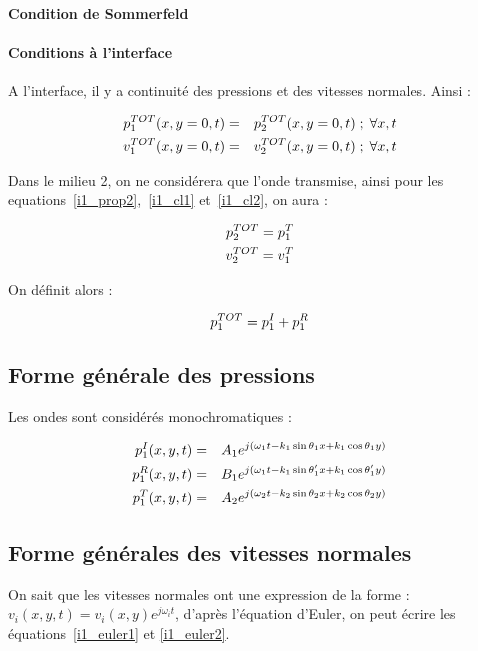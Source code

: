 \paragraph{Condition de Sommerfeld}

\paragraph{Conditions à l'interface}

A l'interface, il y a continuité des pressions et des vitesses normales. Ainsi :

\begin{eqnarray}
    p^{TOT}_1(x, y=0, t) &=& p^{TOT}_2(x,y=0,t) \;;\;\forall x,t \label{i1_cl1}\\
    v^{TOT}_1(x, y=0, t) &=& v^{TOT}_2(x,y=0,t) \;;\;\forall x,t \label{i1_cl2}
\end{eqnarray}

Dans le milieu 2, on ne considérera que l'onde transmise, ainsi pour les equations~\eqref{i1_prop2},~\eqref{i1_cl1}
et~\eqref{i1_cl2}, on aura :

\begin{eqnarray*}
    p^{TOT}_2 = p^T_1\\
    v^{TOT}_2 = v^T_1
\end{eqnarray*}

On définit alors :

$$p^{TOT}_1 = p^I_1 + p^R_1$$

\subsection{Forme générale des pressions}

Les ondes sont considérés monochromatiques :

\begin{eqnarray}
    p^I_1(x,y,t) & = & A_1e^{j(\omega_1t-k_1\sin\theta_1x+k_1\cos\theta_1y)} \label{i1_pgeni}\\
    p^R_1(x,y,t) & = & B_1e^{j(\omega_1t-k_1\sin\theta_1'x+k_1\cos\theta_1'y)} \label{i1_pgenr}\\
    p^T_1(x,y,t) & = & A_2e^{j(\omega_2t-k_2\sin\theta_2x+k_2\cos\theta_2y)} \label{i1_pgent}
\end{eqnarray}

\subsection{Forme générales des vitesses normales}

On sait que les vitesses normales ont une expression de la forme : $v_i(x,y,t) = v_i(x,y)e^{j\omega_it}$, d'après
l'équation d'Euler, on peut écrire les équations~\eqref{i1_euler1} et \eqref{i1_euler2}.

